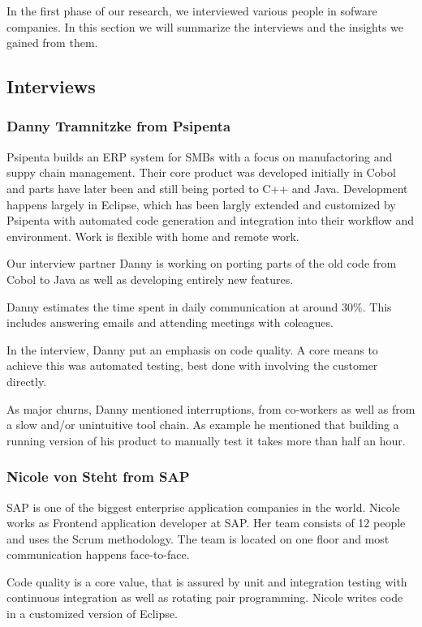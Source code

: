 In the first phase of our research, we interviewed various people in sofware companies. In this section we will summarize the interviews and the insights we gained from them.

\subsection{Interviews}
\subsubsection{Danny Tramnitzke from Psipenta}
Psipenta builds an ERP system for SMBs with a focus on manufactoring and suppy chain management. Their core product was developed initially in Cobol and parts have later been and still being ported to C++ and Java. Development happens largely in Eclipse, which has been largly extended and customized by Psipenta with automated code generation and integration into their workflow and environment. Work is flexible with home and remote work.

Our interview partner Danny is working on porting parts of the old code from Cobol to Java as well as developing entirely new features.

Danny estimates the time spent in daily communication at around 30\%. This includes answering emails and attending meetings with coleagues.

In the interview, Danny put an emphasis on code quality. A core means to achieve this was automated testing, best done with involving the customer directly.

As major churns, Danny mentioned interruptions, from co-workers as well as from a slow and/or unintuitive tool chain. As example he mentioned that building a running version of his product to manually test it takes more than half an hour.

\subsubsection{Nicole von Steht from SAP}
SAP is one of the biggest enterprise application companies in the world. Nicole works as Frontend application developer at SAP. Her team consists of 12 people and uses the Scrum methodology. The team is located on one floor and most communication happens face-to-face.

Code quality is a core value, that is assured by unit and integration testing with continuous integration as well as rotating pair programming. Nicole writes code in a customized version of Eclipse.

